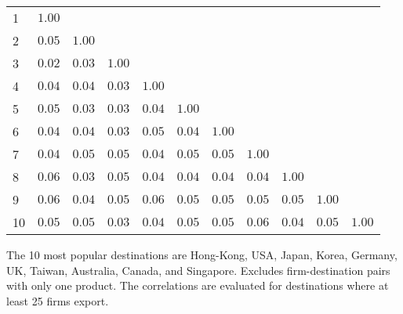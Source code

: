 \documentclass{article}
\begin{document}
\begin{table}[h]
{\begin{threeparttable}
\begin{tabular}{lrrrrrrrrrr}
\cmidrule{2-11} 
1  & $1.00$    &              &             &             &              &            &               &            &              &                        \\  
2  & $0.05$    & $1.00$     &             &             &              &            &               &            &              &                        \\  
3  & $0.02$    & $0.03$     & $1.00$    &             &              &            &               &            &              &                        \\  
4  & $0.04$    & $0.04$     & $0.03$    &  $1.00$   &              &            &               &            &              &                        \\  
5  & $0.05$    & $0.03$     & $0.03$    &  $0.04$   & $1.00$     &            &               &            &              &                        \\  
6  & $0.04$    & $0.04$     & $0.03$    &  $0.05$   & $0.04$     &  $1.00$  &               &            &              &                        \\  
7  & $0.04$    & $0.05$     & $0.05$    &  $0.04$   & $0.05$     &  $0.05$  &  $1.00$     &            &              &                        \\  
8  & $0.06$    & $0.03$     & $0.05$    &  $0.04$   & $0.04$     &  $0.04$  &  $0.04$     & $1.00$   &              &                        \\  
9  & $0.06$    & $0.04$     & $0.05$    &  $0.06$   & $0.05$     &  $0.05$  &  $0.05$     & $0.05$   & $1.00$     &                        \\  
10 & $0.05$   & $0.05$    & $0.03$   &  $0.04$  & $0.05$    &  $0.05$ &  $0.06$    & $0.04$  & $0.05$    &   $1.00$           \\  
\hline
\hline
\end{tabular}
\begin{tablenotes}
\small
\item  \noindent  \footnotesize{The 10 most popular destinations are Hong-Kong, USA, Japan, Korea, Germany, UK, Taiwan, Australia, Canada, and Singapore. Excludes firm-destination pairs with only one product. The correlations are evaluated for destinations where at least 25 firms export.}
\end{tablenotes}
\end{threeparttable}
}
\end{table}
\end{document}
